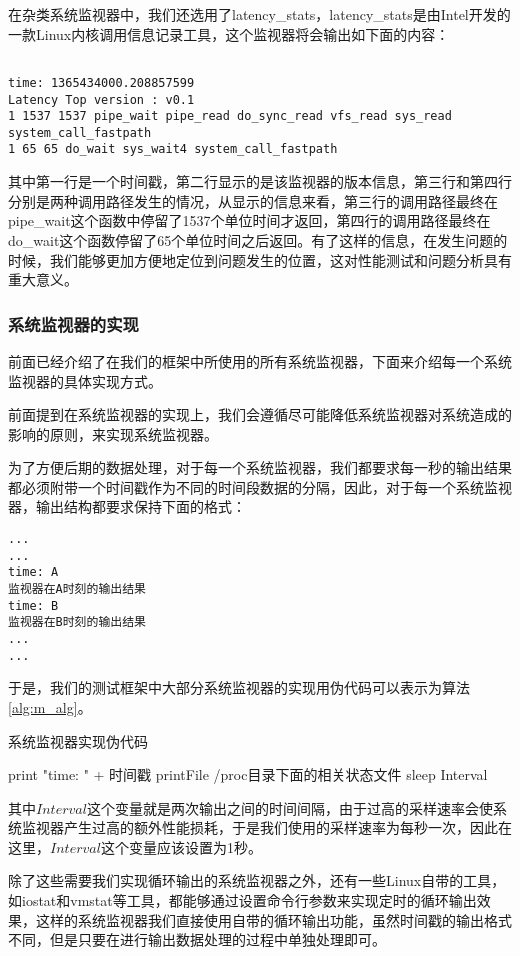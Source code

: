 在杂类系统监视器中，我们还选用了latency\_stats，latency\_stats是由Intel开发的一款Linux内核调用信息记录工具，这个监视器将会输出如下面的内容：
{
\footnotesize
\begin{verbatim}

time: 1365434000.208857599
Latency Top version : v0.1
1 1537 1537 pipe_wait pipe_read do_sync_read vfs_read sys_read system_call_fastpath
1 65 65 do_wait sys_wait4 system_call_fastpath
\end{verbatim}
}
其中第一行是一个时间戳，第二行显示的是该监视器的版本信息，第三行和第四行分别是两种调用路径发生的情况，从显示的信息来看，第三行的调用路径最终在pipe\_wait这个函数中停留了1537个单位时间才返回，第四行的调用路径最终在do\_wait这个函数停留了65个单位时间之后返回。有了这样的信息，在发生问题的时候，我们能够更加方便地定位到问题发生的位置，这对性能测试和问题分析具有重大意义。


\subsubsection{系统监视器的实现}
前面已经介绍了在我们的框架中所使用的所有系统监视器，下面来介绍每一个系统监视器的具体实现方式。

前面提到在系统监视器的实现上，我们会遵循尽可能降低系统监视器对系统造成的影响的原则，来实现系统监视器。

为了方便后期的数据处理，对于每一个系统监视器，我们都要求每一秒的输出结果都必须附带一个时间戳作为不同的时间段数据的分隔，因此，对于每一个系统监视器，输出结构都要求保持下面的格式：
\begin{verbatim}
...
...
time: A
监视器在A时刻的输出结果
time: B
监视器在B时刻的输出结果
...
...
\end{verbatim}

于是，我们的测试框架中大部分系统监视器的实现用伪代码可以表示为算法\ref{alg:m_alg}。


\begin{algorithm}
\caption{系统监视器实现伪代码}
\label{alg:m_alg}
{
     print "time: " + 时间戳\;
     printFile /proc目录下面的相关状态文件\;
     sleep Interval\;
}
\end{algorithm}



其中$Interval$这个变量就是两次输出之间的时间间隔，由于过高的采样速率会使系统监视器产生过高的额外性能损耗，于是我们使用的采样速率为每秒一次，因此在这里，$Interval$这个变量应该设置为1秒。

除了这些需要我们实现循环输出的系统监视器之外，还有一些Linux自带的工具，如iostat和vmstat等工具，都能够通过设置命令行参数来实现定时的循环输出效果，这样的系统监视器我们直接使用自带的循环输出功能，虽然时间戳的输出格式不同，但是只要在进行输出数据处理的过程中单独处理即可。

